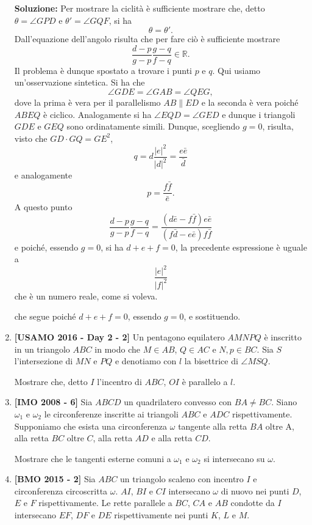 \begin{enumerate}
	\textbf{Soluzione:} Per mostrare la ciclità è sufficiente mostrare che, detto $\theta=\angle GPD$ e $\theta'=\angle GQF$, si ha 
	$$
	\theta=\theta'.
	$$  
	Dall'equazione dell'angolo risulta che per fare ciò è sufficiente mostrare
	$$
	\frac{d-p}{g-p}\frac{g-q}{f-q}\in\mathbb R.
	$$
	Il problema è dunque spostato a trovare i punti $p$ e $q$. Qui usiamo un'osservazione sintetica. Si ha che 
	$$
	\angle GDE=\angle GAB = \angle QEG,
	$$
	dove la prima è vera per il parallelismo $AB\parallel ED$ e la seconda è vera poiché $ABEQ$ è ciclico. 
	Analogamente si ha $\angle EQD=\angle GED$ e dunque i triangoli $GDE$ e $GEQ$ sono ordinatamente simili.
	Dunque, scegliendo $g=0$, risulta, visto che $GD\cdot GQ=GE^2$,
	$$
	q=d\frac{|e|^2}{|d|^2}=\frac{e\bar e}{\bar d}
	$$
	e analogamente 
	$$
	p=\frac{f\bar f}{\bar e}.
	$$
	A questo punto 
	$$
	\frac{d-p}{g-p}\frac{g-q}{f-q}=\frac{(d\bar e-f\bar f)e\bar e}{(f\bar d-e\bar e)f\bar f}
	$$
	e poiché, essendo $g=0$, si ha $d+e+f=0$, la precedente espressione è uguale a 
	$$
	\frac{|e|^2}{|f|^2}
	$$ 
	che è un numero reale, come si voleva.
	
	che segue poiché $d+e+f=0$, essendo $g=0$, e sostituendo. 
	
	
	\item \textbf{[USAMO 2016 - Day 2 - 2]} Un pentagono equilatero $AMNPQ$ è inscritto in un triangolo $ABC$ in modo che $M\in AB$, $Q\in AC$ e $N,p \in BC$. Sia $S$ l'intersezione di $MN$ e $PQ$ e denotiamo con $l$ la bisettrice di $\angle MSQ$. 
	
	Mostrare che, detto $I$ l'incentro di $ABC$, $OI$ è parallelo a $l$.
	\item \textbf{[IMO 2008 - 6]} Sia $ABCD$ un quadrilatero convesso con $BA \neq BC$. Siano $\omega_1$ e $\omega_2$ le circonferenze inscritte ai triangoli $ABC$ e $ADC$ rispettivamente. Supponiamo che esista una circonferenza $\omega$ tangente alla retta $BA$ oltre A, alla retta $BC$ oltre $C$, alla retta $AD$ e alla retta $CD$.
	
	Mostrare che le tangenti esterne comuni a $\omega_1$ e $\omega_2$ si intersecano su $\omega$.
	
	\item \textbf{[BMO 2015 - 2]} Sia $ABC$ un triangolo scaleno con incentro $I$ e circonferenza circoscritta $\omega$. $AI$, $BI$ e $CI$ intersecano $\omega$ di nuovo nei punti $D$, $E$ e $F$ rispettivamente. Le rette parallele a $BC$, $CA$ e $AB$ condotte da $I$ intersecano $EF$, $DF$ e $DE$ rispettivamente nei punti $K$, $L$ e $M$.
	

\end{enumerate}
